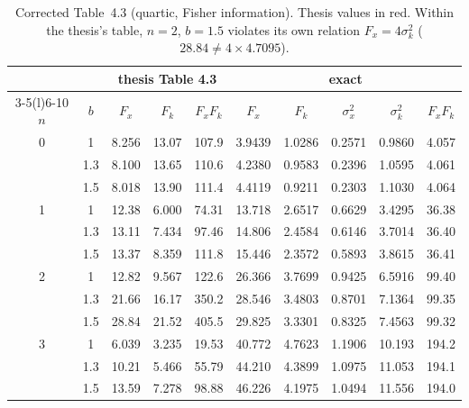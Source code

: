 \documentclass[11pt,a4paper]{article}
\newcommand{\Th}[1]{\textcolor{BrickRed}{#1}}
\begin{document}
\begin{table}[h]
\centering\small
\setlength{\tabcolsep}{4.5pt}
\begin{tabular}{@{}cc ccc ccccc@{}}
\toprule
& & \multicolumn{3}{c}{thesis Table 4.3} & \multicolumn{5}{c}{exact}\\
\cmidrule(lr){3-5}\cmidrule(l){6-10}
$n$ & $b$ & $F_x$ & $F_k$ & $F_xF_k$ & $F_x$ & $F_k$ & $\sigma_x^2$ & $\sigma_k^2$ & $F_xF_k$\\
\midrule
0 & 1   & \Th{8.256} & \Th{13.07} & \Th{107.9} & 3.9439 & 1.0286 & 0.2571 & 0.9860 & 4.057\\
  & 1.3 & \Th{8.100} & \Th{13.65} & \Th{110.6} & 4.2380 & 0.9583 & 0.2396 & 1.0595 & 4.061\\
  & 1.5 & \Th{8.018} & \Th{13.90} & \Th{111.4} & 4.4119 & 0.9211 & 0.2303 & 1.1030 & 4.064\\
1 & 1   & \Th{12.38} & \Th{6.000} & \Th{74.31} & 13.718 & 2.6517 & 0.6629 & 3.4295 & 36.38\\
  & 1.3 & \Th{13.11} & \Th{7.434} & \Th{97.46} & 14.806 & 2.4584 & 0.6146 & 3.7014 & 36.40\\
  & 1.5 & \Th{13.37} & \Th{8.359} & \Th{111.8} & 15.446 & 2.3572 & 0.5893 & 3.8615 & 36.41\\
2 & 1   & \Th{12.82} & \Th{9.567} & \Th{122.6} & 26.366 & 3.7699 & 0.9425 & 6.5916 & 99.40\\
  & 1.3 & \Th{21.66} & \Th{16.17} & \Th{350.2} & 28.546 & 3.4803 & 0.8701 & 7.1364 & 99.35\\
  & 1.5 & \Th{28.84} & \Th{21.52} & \Th{405.5} & 29.825 & 3.3301 & 0.8325 & 7.4563 & 99.32\\
3 & 1   & \Th{6.039} & \Th{3.235} & \Th{19.53} & 40.772 & 4.7623 & 1.1906 & 10.193 & 194.2\\
  & 1.3 & \Th{10.21} & \Th{5.466} & \Th{55.79} & 44.210 & 4.3899 & 1.0975 & 11.053 & 194.1\\
  & 1.5 & \Th{13.59} & \Th{7.278} & \Th{98.88} & 46.226 & 4.1975 & 1.0494 & 11.556 & 194.0\\
\bottomrule
\end{tabular}
\caption{Corrected Table~4.3 (quartic, Fisher information). Thesis values in red. Within
the thesis's table, $n=2$, $b=1.5$ violates its own relation $F_x=4\sigma_k^2$
($28.84\ne4\times4.7095$).}
\label{tab:q43}
\end{table}
\end{document}
